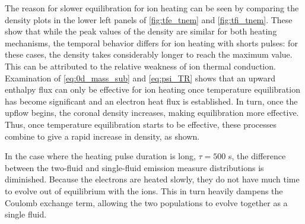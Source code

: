 \documentclass[iop]{emulateapj}
\begin{document}
	\par The reason for slower equilibration for ion heating can be seen by comparing the density plots in the lower left panels of \autoref{fig:tfe_tnem} and \autoref{fig:tfi_tnem}. These show that while the peak values of the density are similar for both heating mechanisms, the temporal behavior differs for ion heating with shorts pulses: for these cases, the density takes considerably longer to reach the maximum value. This can be attributed to the relative weakness of ion thermal conduction. Examination of \autoref{eq:0d_mass_sub} and \autoref{eq:psi_TR} shows that an upward enthalpy flux can only be effective for ion heating once temperature equilibration has become significant and an electron heat flux is established. In turn, once the upflow begins, the coronal density increases, making equilibration more effective. Thus, once temperature equilibration starts to be effective, these processes combine to give a rapid increase in density, as shown.
	\par In the case where the heating pulse duration is long, $\tau=500$ s, the difference between the two-fluid and single-fluid emission measure distributions is diminished. Because the electrons are heated slowly, they do not have much time to evolve out of equilibrium with the ions. This in turn heavily dampens the Coulomb exchange term, allowing the two populations to evolve together as a single fluid.
\end{document}
